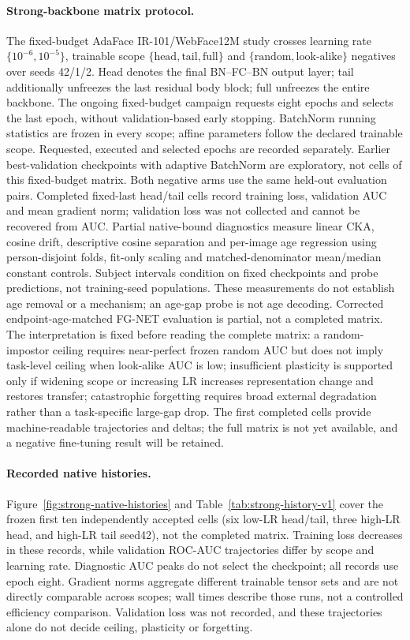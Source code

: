 \documentclass[journal]{IEEEtran}
\begin{document}
\paragraph{Strong-backbone matrix protocol.}
The fixed-budget AdaFace IR-101/WebFace12M study crosses learning rate
$\{10^{-6},10^{-5}\}$, trainable scope $\{\text{head},\text{tail},\text{full}\}$ and
$\{\text{random},\text{look-alike}\}$ negatives over seeds 42/1/2. Head denotes the final
BN--FC--BN output layer; tail additionally unfreezes the last residual body block; full unfreezes the
entire backbone. The ongoing fixed-budget campaign requests eight epochs and selects the last
epoch, without validation-based early stopping. BatchNorm running statistics are frozen in every
scope; affine parameters follow the declared trainable scope. Requested, executed and selected epochs
are recorded separately. Earlier best-validation checkpoints with adaptive BatchNorm are exploratory,
not cells of this fixed-budget matrix. Both negative arms use the same held-out evaluation pairs.
Completed fixed-last head/tail cells record training loss, validation AUC and mean gradient norm;
validation loss was not collected and cannot be recovered from AUC. Partial native-bound diagnostics
measure linear CKA, cosine drift, descriptive cosine separation and per-image age regression using
person-disjoint folds, fit-only scaling and matched-denominator mean/median constant controls.
Subject intervals condition on fixed checkpoints and probe predictions, not training-seed populations.
These measurements do not establish age removal or a mechanism; an age-gap probe is not age decoding.
Corrected endpoint-age-matched FG-NET evaluation is partial, not a completed matrix. The interpretation
is fixed before reading the complete matrix: a random-impostor ceiling requires near-perfect frozen
random AUC but does not imply task-level ceiling when look-alike AUC is low; insufficient plasticity is
supported only if widening scope or increasing LR increases representation change and restores transfer;
catastrophic forgetting requires broad external degradation rather than a task-specific large-gap drop.
The first completed cells provide machine-readable trajectories and deltas;
the full matrix is not yet available, and a negative fine-tuning result will be retained.

\paragraph{Recorded native histories.}
Figure~\ref{fig:strong-native-histories} and Table~\ref{tab:strong-history-v1}
cover the frozen first ten independently accepted cells (six low-LR head/tail,
three high-LR head, and high-LR tail seed42), not the completed matrix.
Training loss decreases in these records, while validation ROC-AUC trajectories differ
by scope and learning rate. Diagnostic AUC peaks do not select the checkpoint;
all records use epoch eight. Gradient norms aggregate different trainable tensor
sets and are not directly comparable across scopes; wall times describe those
runs, not a controlled efficiency comparison. Validation loss was not recorded,
and these trajectories alone do not decide ceiling, plasticity or forgetting.
\end{document}
